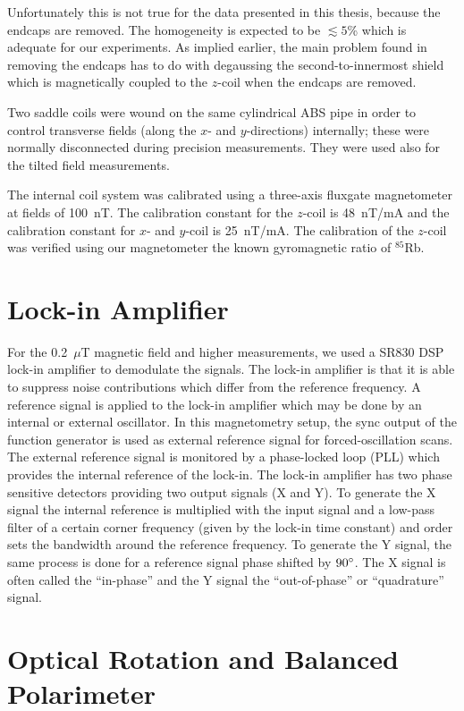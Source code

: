 Unfortunately this is not true for the data presented in this thesis,
because the endcaps are removed.  The homogeneity is expected to be
$\lesssim 5$\% which is adequate for our experiments.  As implied
earlier, the main problem found in removing the endcaps has to do with
degaussing the second-to-innermost shield which is magnetically
coupled to the $z$-coil when the endcaps are removed.

Two saddle coils were wound on the same cylindrical ABS pipe in order
to control transverse fields (along the $x$- and $y$-directions)
internally; these were normally disconnected during precision
measurements.  They were used also for the tilted field measurements.

The internal coil system was calibrated using a three-axis fluxgate
magnetometer at fields of 100~nT.  The calibration constant for the
$z$-coil is 48~nT/mA and the calibration constant for $x$- and
$y$-coil is 25~nT/mA. The calibration of the $z$-coil was verified
using our magnetometer the known gyromagnetic ratio of $^{85}$Rb.


\section{Lock-in Amplifier}

For the 0.2~$\mu$T magnetic field and higher measurements, we used a
SR830 DSP lock-in amplifier to demodulate the signals.  The lock-in
amplifier is that it is able to suppress noise contributions which
differ from the reference frequency.  A reference signal is applied to
the lock-in amplifier which may be done by an internal or external
oscillator. In this magnetometry setup, the sync output of the
function generator is used as external reference signal for
forced-oscillation scans.  The external reference signal is monitored
by a phase-locked loop (PLL) which provides the internal reference of
the lock-in.  The lock-in amplifier has two phase sensitive detectors
providing two output signals (X and Y). To generate the X signal the
internal reference is multiplied with the input signal and a low-pass
filter of a certain corner frequency (given by the lock-in time
constant) and order sets the bandwidth around the reference frequency.
To generate the Y signal, the same process is done for a reference
signal phase shifted by $90\degree$.  The X signal is often called the
``in-phase'' and the Y signal the ``out-of-phase'' or ``quadrature''
signal.


\section{Optical Rotation and Balanced Polarimeter\label{sec:Signal Processing}}


